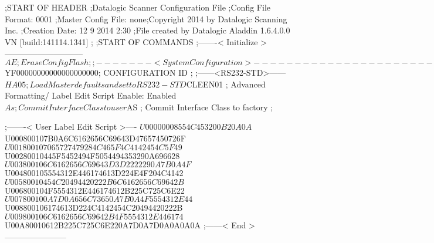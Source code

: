 ;START OF HEADER
;Datalogic Scanner Configuration File
;Config File Format: 0001
;Master Config File: none;Copyright 2014 by Datalogic Scanning Inc.
;Creation Date: 12 9 2014 2:30
;File created by Datalogic Aladdin 1.6.4.0.0 VN [build:141114.1341]
;
;START OF COMMANDS
;-------< Initialize >-----------------------------
$AE                 ; Erase Config Flash
;
;-------< System Configuration >-------------------------------
$YF00000000000000000000; CONFIGURATION ID
;
;------<RS232-STD>------
$HA05              ; Load Master defaults and set to RS232-STD
$CLEEN01            ; Advanced Formatting/ Label Edit Script Enable: Enabled
$As                 ; Commit Interface Class to user
$AS                 ; Commit Interface Class to factory
;

;-------< User Label Edit Script >----
$U00000008554C453200B20A0A
$U000800107B0A6C6162656C69643D47657450726F
$U001800107065727479284C465F4C4142454C5F49
$U00280010445F5452494F5054494353290A696628
$U003800106C6162656C69643D3D2222290A7B0A4F
$U004800105554312E446174613D224E4F204C4142
$U00580010454C20494420222B6C6162656C69642B
$U006800104F5554312E446174612B225C725C6E22
$U007800100A7D0A656C73650A7B0A4F5554312E44
$U008800106174613D224C4142454C20494420222B
$U009800106C6162656C69642B4F5554312E446174
$U00A80010612B225C725C6E220A7D0A7D0A0A0A0A
;------< End >-----------------------
